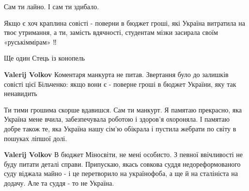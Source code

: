 \begin{itemize}
\begin{itemize}
Сам ти лайно.
І сам ти здибало.
\end{itemize}

 

Якщо є хоч краплина совісті - поверни в бюджет гроші, які Україна витратила на
твоє утримання, а ти, замість вдячності, студентам мізки засирала своїм
«руськіммірам» ‼️

\begin{itemize}
 
Ще один Стець із конопель

 
\textbf{Valerij Volkov} Коментаря манкурта не питав. Звертання було до залишків
совісті цієї Більченко: якщо вони є - поверне гроші в бюджет України, яку так
ненавидить

 
Ти тими грошима скорше вдавишся.
Сам ти манкурт.
Я памятаю прекрасно, яка Україна мене вчила, забезпечувала роботою і здоров'я охороняла.
І памятаю добре також те, яка Україна нашу сім'ю обікрала і пустила жебрати по світу в пошуках ліпшої долі.

 
\textbf{Valerij Volkov} В бюджет Міносвіти, не мені особисто.
З певної ввічливості не буду питати деталі справи. Припускаю, якась совкова суддя недореформованого суду віджала майно - і це перетворило на українофоба, а ще й на сталініста на додачу.
Але та суддя - то не Україна.


\end{itemize}
\end{itemize}
